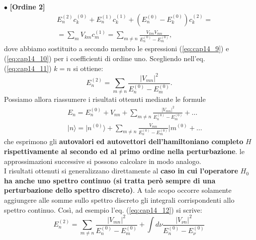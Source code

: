 $\bullet$ \textbf{[Ordine 2]}\\
\begin{eqnarray}
& & E_n^{(2)}c_k^{(0)}+E_n^{(1)}c_k^{(1)}+ \left( E_n^{(0)}-E_k ^{(0)}\right) c_k^{(2)} = \nonumber \\
& & = \sum _m V_{km} c_m ^{(1)} = \sum _{m\neq n} \frac{V_{km} V_{mn}}{E_n^{(0)}-E_m ^{(0)}},
\label{eq:cap14_11}
\end{eqnarray}
dove abbiamo sostituito a secondo membro le espressioni (\ref{eq:cap14_9}) e (\ref{eq:cap14_10}) per i coefficienti di ordine uno. Scegliendo nell'eq. (\ref{eq:cap14_11}) $k=n$ si ottiene:
\begin{equation}
E_n ^{(2)} = \sum _{m \neq n } \frac{\vert V_{mn} \vert ^2}{E_n ^{(0)}-E_m ^{(0)}}.
\label{eq:cap14_12}
\end{equation}
Possiamo allora riassumere i risultati ottenuti mediante le formule
\begin{eqnarray}
& & E_n = E_n ^{(0)}+ V_{nn} +\sum _{m \neq n } \frac{\vert V_{mn} \vert ^2}{E_n ^{(0)}-E_m ^{(0)}}+ \dots \\
& & \vert n \rangle = \vert n^{(0)} \rangle +\sum _{m \neq n } \frac{V_{mn} }{E_n ^{(0)}-E_m ^{(0)}} \vert m^{(0)}+ \dots 
\end{eqnarray}
che esprimono gli \textbf{autovalori ed autovettori dell'hamiltoniano completo} $H$ \textbf{rispettivamente al secondo ed al primo ordine nella perturbazione}. le approssimazioni successive si possono calcolare in modo analogo.\\
I risultati ottenuti si generalizzano direttamente al \textbf{caso in cui l'operatore} $H_0$ \textbf{ha anche uno spettro continuo (si tratta però sempre di una perturbazione dello spettro discreto)}. A tale scopo occorre solamente aggiungere alle somme sullo spettro discreto gli integrali corrispondenti allo spettro continuo. Così, ad esempio l'eq. (\ref{eq:cap14_12}) si scrive:
\begin{equation}
E_n ^{(2)} = \sum _{m \neq n} \frac{\vert V_{mn} \vert ^2}{E_n ^{(0)}-E_m ^{(0)}}+ \int d\nu \frac{\vert V_{\nu n} \vert ^2}{E_n ^{(0)}-E_{\nu} ^{(0)}} 
\end{equation}
